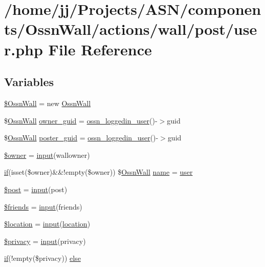 \hypertarget{user_8php}{}\section{/home/jj/\+Projects/\+A\+S\+N/components/\+Ossn\+Wall/actions/wall/post/user.php File Reference}
\label{user_8php}
\subsection*{Variables}
\begin{DoxyCompactItemize}
\item 
\hyperlink{user_8php_a3fe8a689739786120fddd91dedeb172b}{\$\+Ossn\+Wall} = new \hyperlink{class_ossn_wall}{Ossn\+Wall}
\item 
\$\hyperlink{class_ossn_wall}{Ossn\+Wall} \hyperlink{user_8php_a307051fefc937afd02c509c55646f50b}{owner\+\_\+guid} = \hyperlink{ossn_8lib_8users_8php_aa3c8068d0e6638b414d6a2f6c62565b8}{ossn\+\_\+loggedin\+\_\+user}()-\/$>$guid
\item 
\$\hyperlink{class_ossn_wall}{Ossn\+Wall} \hyperlink{user_8php_a24eb7b66e353d8983f6f2af979250671}{poster\+\_\+guid} = \hyperlink{ossn_8lib_8users_8php_aa3c8068d0e6638b414d6a2f6c62565b8}{ossn\+\_\+loggedin\+\_\+user}()-\/$>$guid
\item 
\hyperlink{user_8php_a9aabf46bdb166877480b2094d7ca01a7}{\$owner} = \hyperlink{ossn_8lib_8input_8php_a64ebee98b041c4f75f71ed3cd73cc8ed}{input}(\textquotesingle{}wallowner\textquotesingle{})
\item 
\hyperlink{jquery_8tokeninput_8js_ad8dd46a3cbc004569e34401e9e71771a}{if}(isset(\$owner)\&\&!empty(\$owner)) \$\hyperlink{class_ossn_wall}{Ossn\+Wall} \hyperlink{user_8php_a765af5e9671743530143a6d3670fd9a6}{name} = \textquotesingle{}\hyperlink{ossn_8config_8db_8example_8php_a802544b7ba9f79bbf24ef67773d53bed}{user}\textquotesingle{}
\item 
\hyperlink{user_8php_a53d6c7669d97392c407c4f959a5263db}{\$post} = \hyperlink{ossn_8lib_8input_8php_a64ebee98b041c4f75f71ed3cd73cc8ed}{input}(\textquotesingle{}post\textquotesingle{})
\item 
\hyperlink{user_8php_afb66104a0d5a5b286634a265d216b8d6}{\$friends} = \hyperlink{ossn_8lib_8input_8php_a64ebee98b041c4f75f71ed3cd73cc8ed}{input}(\textquotesingle{}friends\textquotesingle{})
\item 
\hyperlink{user_8php_ac319193077976bb217112e5a7b7b8022}{\$location} = \hyperlink{ossn_8lib_8input_8php_a64ebee98b041c4f75f71ed3cd73cc8ed}{input}(\textquotesingle{}\hyperlink{_chart_8_doughnut_8js_a761c752fb16f7c0bfe1026b787ca0032}{location}\textquotesingle{})
\item 
\hyperlink{user_8php_add279b6d3dad18665dc1d892af5e6b26}{\$privacy} = \hyperlink{ossn_8lib_8input_8php_a64ebee98b041c4f75f71ed3cd73cc8ed}{input}(\textquotesingle{}privacy\textquotesingle{})
\item 
\hyperlink{jquery_8tokeninput_8js_ad8dd46a3cbc004569e34401e9e71771a}{if}(!empty(\$privacy)) \hyperlink{user_8php_adb2d35e2a6bf03c66a3061c7fb3066f2}{else}
\end{DoxyCompactItemize}



